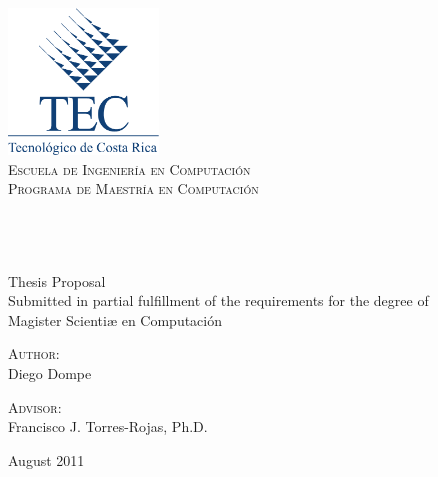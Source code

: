 \begin{titlepage}

\begin{center}

\includegraphics[width=0.3\textwidth]{../Common/Images/logoTec}
\\[0.2cm]
\textcolor{tecblue}{%
\textsc{\LARGE Escuela de Ingeniería en Computación}\\[0.2cm]
\textsc{\large Programa de Maestría en Computación}\\
 }
 \vfill
 
\HRule 
\\[0.9cm]
\doublespacing
{ \huge \bfseries \thesistitle}
\\[0.4cm]
\singlespacing
\HRule 
\\[1.4cm]

{\large Thesis Proposal\\
Submitted in partial fulfillment of the requirements for the degree of\\[0.6cm]
Magister Scientiæ en Computación}
\\
\vfill
 
\begin{minipage}{0.45\textwidth}
\begin{flushleft} \large
\textsc{Author:}\\
{Diego Dompe}
\end{flushleft}
\end{minipage}
\begin{minipage}{0.50\textwidth}
\begin{flushright} \large
\textsc{Advisor:}\\
{Francisco J. Torres-Rojas, Ph.D.}
\end{flushright}
\end{minipage}
 
 
\vfill
 
{\large August 2011}
 \end{center}
 \end{titlepage}

